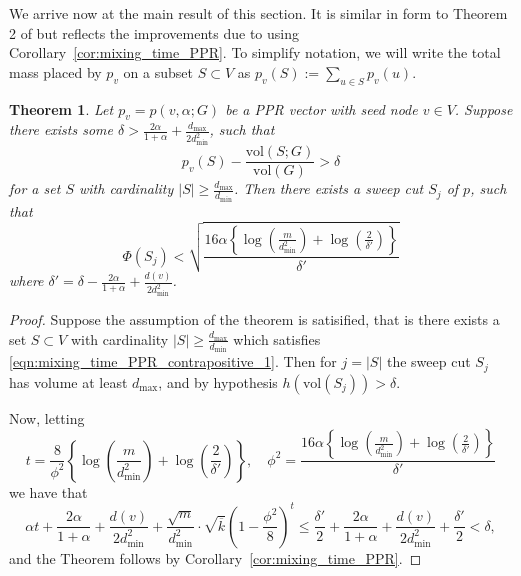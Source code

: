 \documentclass[11pt,twoside]{article}
\newtheorem{theorem}{Theorem}
\theoremstyle{definition}
\newcommand{\set}[1]{\left\{#1\right\}}
\newcommand{\vol}{\mathrm{vol}}
\newcommand{\abs}[1]{\left \lvert #1 \right \rvert}
\newcommand{\1}{\mathbbm{1}}
\begin{document}
We arrive now at the main result of this section. It is similar in form to Theorem 2 of \citet{andersen2006} but reflects the improvements due to using Corollary~\ref{cor:mixing_time_PPR}. To simplify notation, we will write the total mass placed by $p_v$ on a subset $S \subset V$ as $p_v(S) := \sum_{u \in S} p_v(u)$.
\begin{theorem}
	\label{thm:mixing_time_PPR_contrapositive}
	Let $p_v = p(v,\alpha;G)$ be a PPR vector with seed node $v \in V$. Suppose there exists some $\delta > \frac{2\alpha}{1 + \alpha} + \frac{d_{\max}}{2d_{\min}^2}$, such that
	\begin{equation}
	\label{eqn:mixing_time_PPR_contrapositive_1}
	p_v(S) - \frac{\vol(S;G)}{\vol(G)} > \delta
	\end{equation}
	for a set $S$ with cardinality $\abs{S} \geq \frac{d_{\max}}{d_{\min}}$. Then there exists a sweep cut $S_j$ of $p$, such that
	\begin{equation*}
	\Phi(S_j) < \sqrt{\frac{16\alpha\left\{\log\left(\frac{m}{d_{\min}^2}\right) + \log\left(\frac{2}{\delta'}\right)\right\}}{\delta'}}
	\end{equation*}
	where $\delta' = \delta - \frac{2\alpha}{1 + \alpha} + \frac{d(v)}{2d_{\min}^2}$. 
\end{theorem}
\begin{proof}
	Suppose the assumption of the theorem is satisified, that is there exists a set $S \subset V$ with cardinality $\abs{S} \geq \frac{d_{\max}}{d_{\min}}$ which satisfies \eqref{eqn:mixing_time_PPR_contrapositive_1}. Then for $j = \abs{S}$ the sweep cut $S_j$ has volume at least $d_{\max}$, and by hypothesis $h(\vol(S_j)) >  \delta$.
	
	Now, letting
	\begin{equation*}
	t = \frac{8}{\phi^2}\left\{\log\left(\frac{m}{d_{\min}^2}\right) + \log\left(\frac{2}{\delta'}\right)\right\}, \quad \phi^2 = \frac{16\alpha\set{\log\left(\frac{m}{d_{\min}^2}\right) + \log(\frac{2}{\delta'})}}{\delta'}
	\end{equation*}
	we have that
	\begin{equation*}
	\alpha t + \frac{2\alpha}{1 + \alpha} + \frac{d(v)}{2d_{\min}^2} + \frac{\sqrt{m}}{d_{\min}^2} \cdot \sqrt{\overline{k}} \left(1 - \frac{\phi^2}{8}\right)^{t} \leq \frac{\delta'}{2} + \frac{2\alpha}{1 + \alpha} + \frac{d(v)}{2d_{\min}^2} + \frac{\delta'}{2} < \delta,
	\end{equation*}
	and the Theorem follows by Corollary~\ref{cor:mixing_time_PPR}.
\end{proof}
\end{document}
